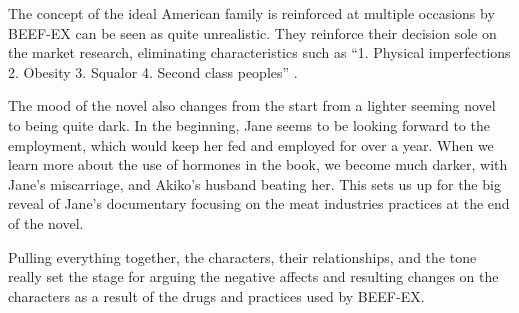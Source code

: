 \documentclass{article}
\begin{document}


The concept of the ideal American family is reinforced at multiple occasions
by BEEF-EX can be seen as quite unrealistic. They reinforce their decision
sole on the market research, eliminating characteristics such as ``1.
Physical imperfections 2. Obesity 3. Squalor 4. Second class peoples''
\cite{ozeki1998my}.

The mood of the novel also changes from the start from a lighter seeming
novel to being quite dark. In the beginning, Jane seems to be looking
forward to the employment, which would keep her fed and employed for over a
year. When we learn more about the use of hormones in the book, we become
much darker, with Jane's miscarriage, and Akiko's husband beating her. This
sets us up for the big reveal of Jane's documentary focusing on the meat
industries practices at the end of the novel.

Pulling everything together, the characters, their relationships, and the
tone really set the stage for arguing the negative affects and resulting
changes on the characters as a result of the drugs and practices used by
BEEF-EX.
\makeworkscited
\end{document}
